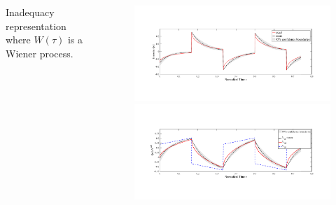 \documentclass[8pt]{beamer}
\begin{document}
\begin{frame}
\begin{columns}
\begin{column}{.44\textwidth}
\begin{alertblock}{Inadequacy representation}
where $W(\tau)$ is a Wiener process.%
\end{alertblock}

\end{column}
\begin{column}{.52\textwidth}
\begin{center}
\begin{figure}[h]
    \centering
    \includegraphics[trim = 1.3in 2.2in 1.6in 2.8in, clip, width=1\textwidth]{figs_report/error_bound.png} 
        \\
    \includegraphics[trim = 1.3in 2.2in 1.6in 2.8in, clip, width=1\textwidth]{figs_report/V_bound.png} 
\end{figure}
\end{center}
\end{column}
\end{columns}
\vspace{2mm}

\vfill
\end{frame}
\end{document}
